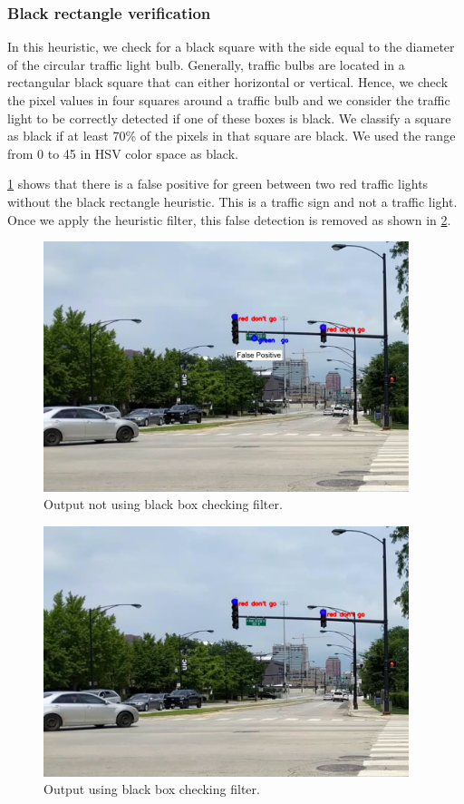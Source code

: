 \subsubsection{Black rectangle verification}
In this heuristic, we check for a black square with the side equal to the diameter of the circular traffic light bulb.
Generally, traffic bulbs are located in a rectangular black square that can either horizontal or vertical.
Hence, we check the pixel values in four squares around a traffic bulb and we consider the traffic light to be correctly detected if one of these boxes is black.
We classify a square as black if at least 70\% of the pixels in that square are black.
We used the range from 0 to 45 in HSV color space as black.

\ref{f:norec_filter} shows that there is a false positive for green between two red traffic lights without the black rectangle heuristic.
This is a traffic sign and not a traffic light.
Once we apply the heuristic filter, this false detection is removed as shown in \ref{f:rec_filter}.

\begin{figure}[!ht]
\centering
\includegraphics[width=4.2in]{images/norec_filter.pdf}
\caption{Output not using black box checking filter.}
\label{f:norec_filter}
\end{figure}



\begin{figure}[!ht]
\centering
\includegraphics[width=4.2in]{images/rec_filter.pdf}
\caption{Output using black box checking filter.}
\label{f:rec_filter}
\end{figure}




